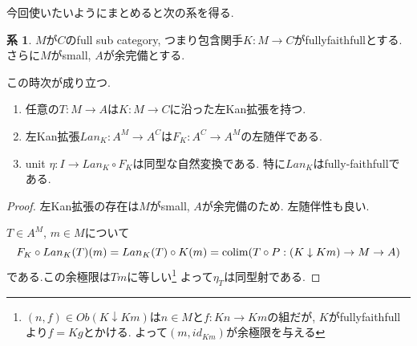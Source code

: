 \documentclass[dvipdfmx,a4paper,11pt]{report}
\newcommand{\colim}{{\rm colim}}
\theoremstyle{definition}
\newtheorem{cor}[thm]{系}
\begin{document}
今回使いたいようにまとめると次の系を得る.
\begin{tcolorbox}
 [colback = white, colframe = green!35!black, fonttitle = \bfseries,breakable = true]
\begin{cor}
\label{cor-leftkan-small}
$M$が$C$のfull sub category, つまり包含関手$K : M \to C$がfullyfaithfullとする.
さらに$M$がsmall, $A$が余完備とする. 

この時次が成り立つ.
\begin{enumerate}
\item 任意の$T : M \to A$は$K : M \to C$に沿った左Kan拡張を持つ.
\item 左Kan拡張$Lan_{K} : A^M \to A^C$は$F_{K} : A^C \to A^M$の左随伴である.
\item unit $\eta : I \to Lan_{K} \circ F_{K}$は同型な自然変換である. 特に$Lan_{K}$はfully-faithfullである.
\end{enumerate}
\end{cor}
\end{tcolorbox}
\begin{proof}
左Kan拡張の存在は$M$がsmall, $A$が余完備のため. 
左随伴性も良い.

$T \in A^M$, $m \in M$について
$$
 F_{K}\circ Lan_{K} (T)(m)
= Lan_{K} (T) \circ K(m)
 =\colim (T \circ P : (K \downarrow Km ) \to M \to A)
$$
である.この余極限は$Tm$に等しい\footnote{$(n, f) \in Ob(K \downarrow Km)$は$n \in M$と$f : Kn \to Km$の組だが, $K$がfullyfaithfullより$f= Kg$とかける. よって$(m, id_{Km})$が余極限を与える}
よって$\eta_T$は同型射である. 
\end{proof}



\end{document}
